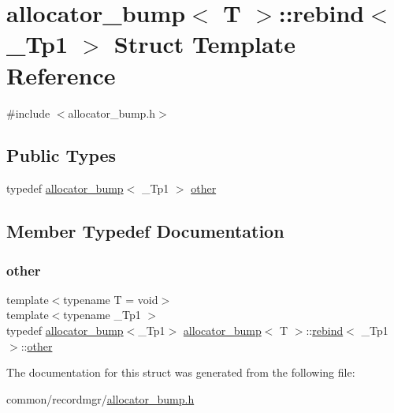 \hypertarget{structallocator__bump_1_1rebind}{}\section{allocator\+\_\+bump$<$ T $>$\+:\+:rebind$<$ \+\_\+\+Tp1 $>$ Struct Template Reference}
\label{structallocator__bump_1_1rebind}


{\ttfamily \#include $<$allocator\+\_\+bump.\+h$>$}

\subsection*{Public Types}
\begin{DoxyCompactItemize}
\item 
typedef \hyperlink{classallocator__bump}{allocator\+\_\+bump}$<$ \+\_\+\+Tp1 $>$ \hyperlink{structallocator__bump_1_1rebind_abb10f6fdb47885c5bcda3502103c5380}{other}
\end{DoxyCompactItemize}


\subsection{Member Typedef Documentation}
\mbox{\label{structallocator__bump_1_1rebind_abb10f6fdb47885c5bcda3502103c5380}} 
\subsubsection{\texorpdfstring{other}{other}}
{\footnotesize\ttfamily template$<$typename T  = void$>$ \\
template$<$typename \+\_\+\+Tp1 $>$ \\
typedef \hyperlink{classallocator__bump}{allocator\+\_\+bump}$<$\+\_\+\+Tp1$>$ \hyperlink{classallocator__bump}{allocator\+\_\+bump}$<$ T $>$\+::\hyperlink{structallocator__bump_1_1rebind}{rebind}$<$ \+\_\+\+Tp1 $>$\+::\hyperlink{structallocator__bump_1_1rebind_abb10f6fdb47885c5bcda3502103c5380}{other}}



The documentation for this struct was generated from the following file\+:\begin{DoxyCompactItemize}
\item 
common/recordmgr/\hyperlink{allocator__bump_8h}{allocator\+\_\+bump.\+h}\end{DoxyCompactItemize}
